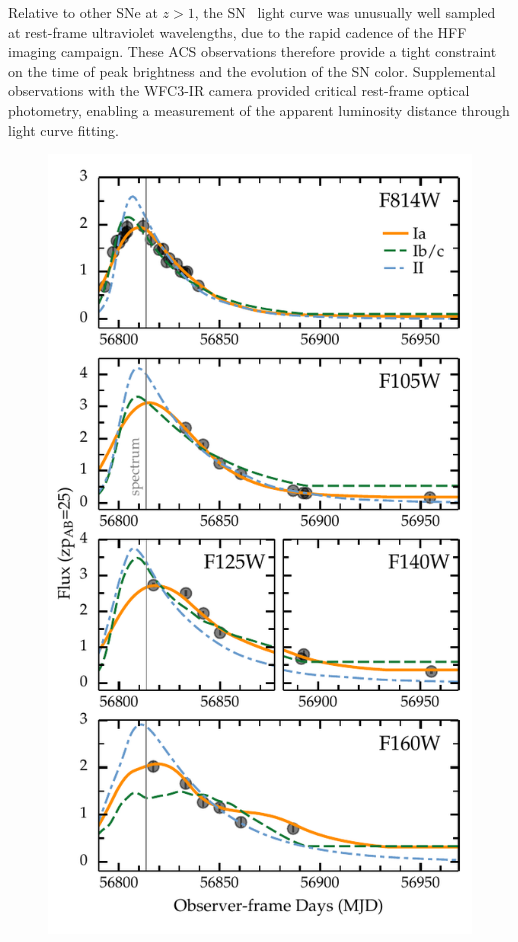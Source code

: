 Relative to other SNe at $z>1$, the SN \tomas\ light curve was
unusually well sampled at rest-frame ultraviolet wavelengths, due to
the rapid cadence of the HFF imaging campaign. These ACS observations
therefore provide a tight constraint on the time of peak brightness
and the evolution of the SN color.  Supplemental observations with the
WFC3-IR camera provided critical rest-frame optical photometry,
enabling a measurement of the apparent luminosity distance through
light curve fitting.

\begin{figure}
\begin{center}
\includegraphics[width=\columnwidth]{FIG/snTomas_lightcurve_classification}

\end{center}
\end{figure}
